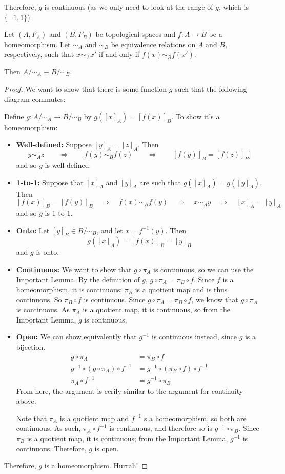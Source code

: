 Therefore, $g$ is continuous (as we only need to look at the range of $g$, which is $\{-1, 1\}$).
\begin{theorem}
Let $(A, F_A)$ and $(B, F_B)$ be topological spaces and $f:A\to B$ be a homeomorphism. Let $\sim_A$ and $\sim_B$ be equivalence relations on $A$ and $B$, respectively, such that $x\sim_A x'$ if and only if $f(x) \sim_B f(x')$.

Then $A/\sim_A \equiv B/\sim_B$. 
\end{theorem}
\begin{proof}
We want to show that there is some function $g$ such that the following diagram commutes: \placeholder

Define $g:A/\sim_A \to B/\sim_B$ by $g\left([x]_A\right) = \left[ f(x) \right]_B$. To show it's a homeomorphism: 
\begin{itemize}
\item {\bf Well-defined:} Suppose $[y]_A = [z]_A$. Then
\[y\sim_A z\qquad\Rightarrow\qquad f(y) \sim_B f(z) \qquad\Rightarrow \qquad[f(y)]_B = [f(z)]_B]\]
and so $g$ is well-defined. 
\item {\bf 1-to-1:} Suppose that $[x]_A$ and $[y]_A$ are such that $g([x]_A) = g([y]_A)$. Then
\[ [f(x)]_B = [f(y)]_B\quad\Rightarrow\quad f(x)\sim_B f(y)\quad\Rightarrow\quad x\sim_A y \quad\Rightarrow\quad [x]_A = [y]_A\]
and so $g$ is 1-to-1. 
\item {\bf Onto: } Let $[y]_B\in B/\sim_B$, and let $x = f^{-1}(y)$. Then
\[ g([x]_A) = [f(x)]_B = [y]_B \]
and $g$ is onto. 
\item {\bf Continuous: } We want to show that $g\circ \pi_A$ is continuous, so we can use the Important Lemma. By the definition of $g$, $g\circ \pi_A = \pi_B\circ f$. Since $f$ is a homeomorphism, it is continuous; $\pi_B$ is a quotient map and is thus continuous. So $\pi_B\circ f$ is continuous. Since $g\circ \pi_A = \pi_B\circ f$, we know that $g\circ \pi_A$ is continuous. As $\pi_A$ is a quotient map, it is continuous, so from the Important Lemma, $g$ is continuous. 
\item {\bf Open: } We can show equivalently that $g^{-1}$ is continuous instead, since $g$ is a bijection. 
\begin{align*}
	g\circ\pi_A &= \pi_B\circ f \\
	g^{-1}\circ(g\circ\pi_A)\circ f^{-1} &= g^{-1}\circ(\pi_B\circ f)\circ f^{-1} \\
	\pi_A\circ f^{-1} & =g^{-1}\circ \pi_B 
\end{align*}
From here, the argument is eerily similar to the argument for continuity above.

Note that $\pi_A$ is a quotient map and $f^{-1}$ s a homeomorphism, so both are continuous. As such, $\pi_A\circ f^{-1}$ is continuous, and therefore so is $g^{-1}\circ \pi_B$. Since $\pi_B$ is a quotient map, it is continuous; from the Important Lemma, $g^{-1}$ is continuous. Therefore, $g$ is open. 
\end{itemize}
Therefore, $g$ is a homeomorphism. Hurrah! 
\end{proof}
